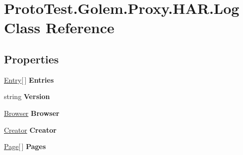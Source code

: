 \hypertarget{class_proto_test_1_1_golem_1_1_proxy_1_1_h_a_r_1_1_log}{\section{Proto\-Test.\-Golem.\-Proxy.\-H\-A\-R.\-Log Class Reference}
\label{class_proto_test_1_1_golem_1_1_proxy_1_1_h_a_r_1_1_log}
}
\subsection*{Properties}
\begin{DoxyCompactItemize}
\item 
\hypertarget{class_proto_test_1_1_golem_1_1_proxy_1_1_h_a_r_1_1_log_a70ce37bacc99bfea2608636307976c6e}{\hyperlink{class_proto_test_1_1_golem_1_1_proxy_1_1_h_a_r_1_1_entry}{Entry}\mbox{[}$\,$\mbox{]} {\bfseries Entries}}\label{class_proto_test_1_1_golem_1_1_proxy_1_1_h_a_r_1_1_log_a70ce37bacc99bfea2608636307976c6e}

\item 
\hypertarget{class_proto_test_1_1_golem_1_1_proxy_1_1_h_a_r_1_1_log_a5f20c9a3cbd36bcf7da04761f74ef46c}{string {\bfseries Version}}\label{class_proto_test_1_1_golem_1_1_proxy_1_1_h_a_r_1_1_log_a5f20c9a3cbd36bcf7da04761f74ef46c}

\item 
\hypertarget{class_proto_test_1_1_golem_1_1_proxy_1_1_h_a_r_1_1_log_ac11fcbf26c8231616fc3066dfcc63f60}{\hyperlink{class_proto_test_1_1_golem_1_1_proxy_1_1_h_a_r_1_1_browser}{Browser} {\bfseries Browser}}\label{class_proto_test_1_1_golem_1_1_proxy_1_1_h_a_r_1_1_log_ac11fcbf26c8231616fc3066dfcc63f60}

\item 
\hypertarget{class_proto_test_1_1_golem_1_1_proxy_1_1_h_a_r_1_1_log_a3171bc98f44a71ded21c52e32edb88c9}{\hyperlink{class_proto_test_1_1_golem_1_1_proxy_1_1_h_a_r_1_1_creator}{Creator} {\bfseries Creator}}\label{class_proto_test_1_1_golem_1_1_proxy_1_1_h_a_r_1_1_log_a3171bc98f44a71ded21c52e32edb88c9}

\item 
\hypertarget{class_proto_test_1_1_golem_1_1_proxy_1_1_h_a_r_1_1_log_a2d594a2182bb61d74dcd80877ef0d690}{\hyperlink{class_proto_test_1_1_golem_1_1_proxy_1_1_h_a_r_1_1_page}{Page}\mbox{[}$\,$\mbox{]} {\bfseries Pages}}\label{class_proto_test_1_1_golem_1_1_proxy_1_1_h_a_r_1_1_log_a2d594a2182bb61d74dcd80877ef0d690}


\end{DoxyCompactItemize}
